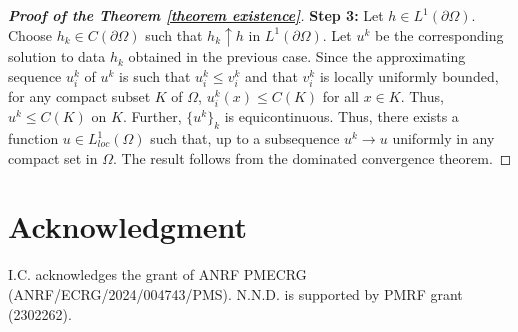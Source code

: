 \documentclass{amsart}
\begin{document}
\begin{proof}[\textbf{Proof of the Theorem \ref{theorem existence}}]
\textbf{Step 3:} Let $h\in L^{1}(\partial\Omega)$. Choose $h_{k}\in C(\partial\Omega)$ such that $h_{k}\uparrow h$ in $L^{1}(\partial\Omega)$. Let $u^{k}$ be the corresponding solution to data $h_{k}$ obtained in the previous case. Since the approximating sequence $u_{i}^{k}$ of $u^{k}$ is such that $u_{i}^{k}\leq v_{i}^{k}$ and that $v_{i}^{k}$ is locally uniformly bounded, for any compact subset $K$ of $\Omega$, $u^{k}_{i}(x)\leq C(K)$ for all $x\in K$. Thus, $u^{k}\leq C(K)$ on $K$. Further, $\{u^{k}\}_{k}$ is equicontinuous. Thus, there exists a function $u\in L^{1}_{loc}(\Omega)$  such that, up to a subsequence $u^{k}\to u$ uniformly in any compact set in $\Omega$. %
The result follows from the dominated convergence theorem.
\end{proof} 
\section{Acknowledgment}
I.C. acknowledges the grant of  ANRF PMECRG (ANRF/ECRG/2024/004743/PMS).
N.N.D. is supported by PMRF grant (2302262). 


\printbibliography
\end{document}
